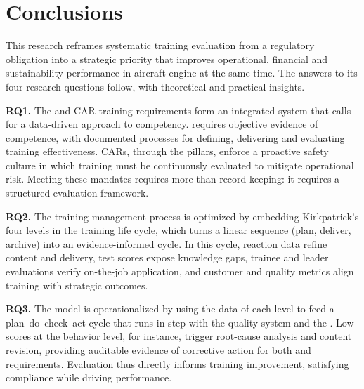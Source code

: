 
\section{Conclusions}
\label{sec:conclusions}

This research reframes systematic training evaluation from a regulatory obligation into a strategic priority that improves operational, financial and sustainability performance in aircraft engine \MRO{} at the same time. The answers to its four research questions follow, with theoretical and practical insights.

\textbf{RQ1.} The \AS{} and CAR training requirements form an integrated system that calls for a data-driven approach to competency. \AS{} requires objective evidence of competence, with documented processes for defining, delivering and evaluating training effectiveness. CARs, through the \SMS{} pillars, enforce a proactive safety culture in which training must be continuously evaluated to mitigate operational risk. Meeting these mandates requires more than record-keeping: it requires a structured evaluation framework.

\textbf{RQ2.} The training management process is optimized by embedding Kirkpatrick's four levels in the training life cycle, which turns a linear sequence (plan, deliver, archive) into an evidence-informed cycle. In this cycle, reaction data refine content and delivery, \LMS{} test scores expose knowledge gaps, trainee and leader evaluations verify on-the-job application, and customer and quality metrics align training with strategic outcomes.

\textbf{RQ3.} The model is operationalized by using the data of each level to feed a plan--do--check--act cycle that runs in step with the \AS{} quality system and the \SMS{}. Low scores at the behavior level, for instance, trigger root-cause analysis and content revision, providing auditable evidence of corrective action for both \AS{} and \CAA{} requirements. Evaluation thus directly informs training improvement, satisfying compliance while driving performance.

